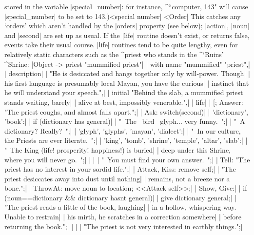 stored in the variable |special_number|: for instance,
^{``computer, 143"} will cause |special_number| to be set to
143.)^^|special number|
\medskip
{}^^|Order|%
This catches any `orders' which aren't
handled by the |orders| property (see below); |action|,
|noun| and |second| are set up as usual. 
\bigskip
\noindent 
If the |life| routine doesn't exist, or returns false, events take their
usual course.  |life| routines tend to be quite lengthy, even for
relatively static characters such as the ^{priest} who stands in
the ^{`Ruins'} ^{Shrine}:
\beginlines
|Object -> priest "mummified priest"|
|  with name "mummified" "priest",|
|       description|
|          "He is desiccated and hangs together only by will-power.  Though|
|           his first language is presumably local Mayan, you have the curious|
|           instinct that he will understand your speech.",|
|       initial "Behind the slab, a mummified priest stands waiting, barely|
|           alive at best, impossibly venerable.",|
|       life|
|       [; Answer: "The priest coughs, and almost falls apart.";|
|          Ask:     switch(second)|
|                   {   'dictionary', 'book':|
|                            if (dictionary has general)|
|                                "~The ~bird~ glyph... very funny.~";|
|                           "~A dictionary? Really?~";|
|                       'glyph', 'glyphs', 'mayan', 'dialect':|
|                           "~In our culture, the Priests are ever literate.~";|
|                       'king', 'tomb', 'shrine', 'temple', 'altar', 'slab':|
|                           "~The King (life! prosperity! happiness!) is buried|
|                            deep under this Shrine, where you will never go.~";|
|                   }|
|                   "~You must find your own answer.~";|
|          Tell:   "The priest has no interest in your sordid life.";|
|          Attack, Kiss:  remove self;|
|                  "The priest desiccates away into dust until nothing|
|                   remains, not a breeze nor a bone.";|
|          ThrowAt: move noun to location; <<Attack self>>;|
|          Show, Give:|
|                   if (noun==dictionary && dictionary hasnt general)|
|                   {   give dictionary general;|
|                      "The priest reads a little of the book, laughing|
|                       in a hollow, whispering way.  Unable to restrain|
|                       his mirth, he scratches in a correction somewhere|
|                       before returning the book.";|
|                   }|
|                  "The priest is not very interested in earthly things.";|
